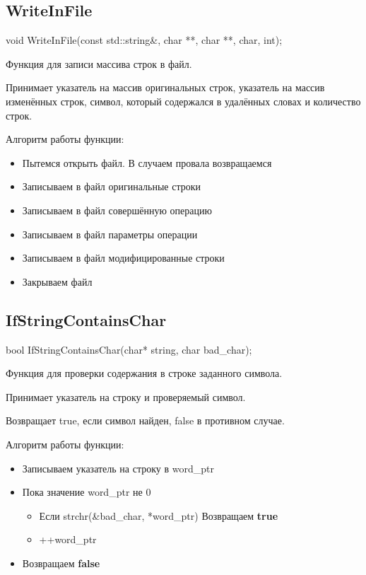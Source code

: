 \documentclass[12pt,a4paper]{article}  %
\begin{document}
	\subsection*{WriteInFile}
	void WriteInFile(const std::string\&, char **, char **, char, int);
	
	Функция для записи массива строк в файл.
	
	Принимает указатель на массив оригинальных строк, указатель на массив изменённых строк, символ, который содержался в удалённых словах и количество строк.
	
	Алгоритм работы функции:
	
	\begin{itemize}
		\item Пытемся открыть файл. В случаем провала возвращаемся
		\item Записываем в файл оригинальные строки
		\item Записываем в файл совершённую операцию
		\item Записываем в файл параметры операции
		\item Записываем в файл модифицированные строки
		\item Закрываем файл
	\end{itemize}
	
	\subsection*{IfStringContainsChar}
	bool IfStringContainsChar(char* string, char bad\_char);
	
	Функция для проверки содержания в строке заданного символа.
	
	Принимает указатель на строку и проверяемый символ.
	
	Возвращает true, если символ найден, false в противном случае.
	
	Алгоритм работы функции:
	
	\begin{itemize}
		\item Записываем указатель на строку в word\_ptr
		\item Пока значение word\_ptr не 0
		\begin{itemize}
			\item Если strchr(\&bad\_char, *word\_ptr) Возвращаем \textbf{true}
			\item ++word\_ptr
		\end{itemize}
		\item Возвращаем \textbf{false}
	\end{itemize}
	
\end{document}
